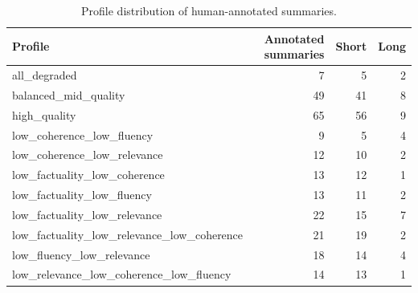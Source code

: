 \begin{table}[htbp]
\centering
\caption{Profile distribution of human-annotated summaries.}
\label{tab:annotated_summary_profile_statistics}
\begin{tabular}{lrrr}
\toprule
Profile & Annotated summaries & Short & Long \\
\midrule
all\_degraded & 7 & 5 & 2 \\
balanced\_mid\_quality & 49 & 41 & 8 \\
high\_quality & 65 & 56 & 9 \\
low\_coherence\_low\_fluency & 9 & 5 & 4 \\
low\_coherence\_low\_relevance & 12 & 10 & 2 \\
low\_factuality\_low\_coherence & 13 & 12 & 1 \\
low\_factuality\_low\_fluency & 13 & 11 & 2 \\
low\_factuality\_low\_relevance & 22 & 15 & 7 \\
low\_factuality\_low\_relevance\_low\_coherence & 21 & 19 & 2 \\
low\_fluency\_low\_relevance & 18 & 14 & 4 \\
low\_relevance\_low\_coherence\_low\_fluency & 14 & 13 & 1 \\
\bottomrule
\end{tabular}
\end{table}
